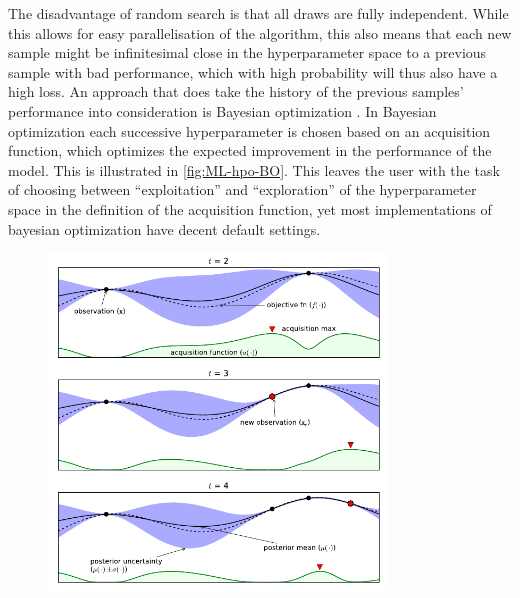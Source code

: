 The disadvantage of random search is that all draws are fully independent. While this allows for easy parallelisation of the algorithm, this also means that each new sample might be infinitesimal close in the hyperparameter space to a previous sample with bad performance, which with high probability will thus also have a high loss. An approach that does take the history of the previous samples' performance into consideration is Bayesian optimization \autocite{brochuTutorialBayesianOptimization2010a}. In Bayesian optimization each successive hyperparameter is chosen based on an acquisition function, which optimizes the expected improvement in the performance of the model. This is illustrated in \autoref{fig:ML-hpo-BO}. This leaves the user with the task of choosing between ``exploitation'' and ``exploration'' of the hyperparameter space in the definition of the acquisition function, yet most implementations of bayesian optimization have decent default settings.

\begin{figure}[htbp]
    \centering
    \includegraphics[width=0.8\textwidth]{figures/MasterThesis-hpo-bayesian}
\end{figure}

